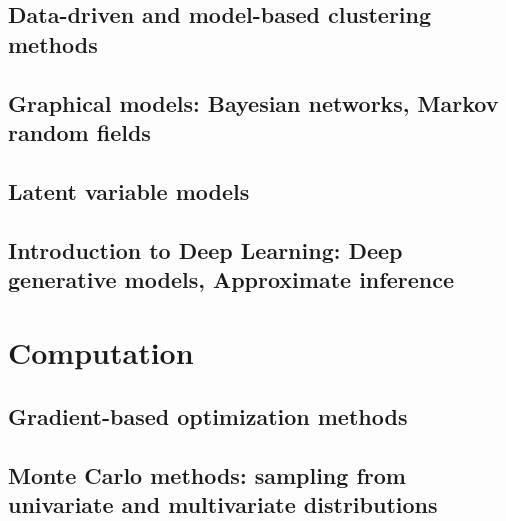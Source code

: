 \documentclass{article}
\begin{document}
\subsection{Data-driven and model-based clustering methods}
\subsection{Graphical models: Bayesian networks, Markov random fields}
\subsection{Latent variable models}
\subsection{Introduction to Deep Learning: Deep generative models, Approximate inference}

\section{Computation}
\subsection{Gradient-based optimization methods}
\subsection{Monte Carlo methods: sampling from univariate and multivariate distributions}

\end{document}
